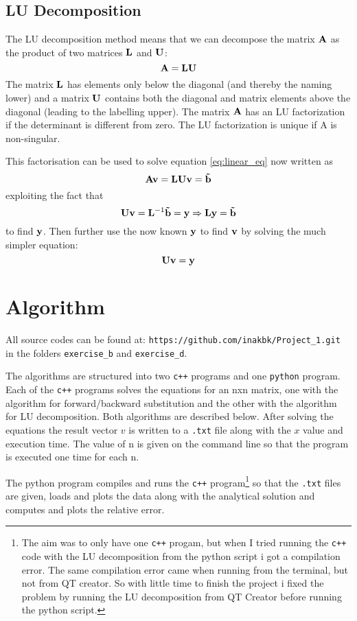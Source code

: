 \documentclass[11pt,a4wide]{article}
\begin{document}

\subsection{LU Decomposition}
The LU decomposition method means that we can decompose the matrix ${\bf A}$ as the product of two matrices ${\bf L}$ and ${\bf U}$:
\[
{\bf A} = {\bf L}{\bf U}
\]
 The matrix ${\bf L}$ has elements only below the diagonal (and thereby the naming lower) and a matrix ${\bf U}$ contains both the diagonal and matrix elements above the diagonal (leading to the labelling upper). The matrix ${\bf A}$ has an LU factorization if the determinant is different from zero. The LU factorization is unique if A is non-singular.
 
 This factorisation can be used to solve equation \ref{eq:linear_eq} now written as
\[
 {\bf A}{\bf v} = {\bf L}{\bf U}{\bf v} = {\bf \tilde{b}}
\]
exploiting the fact that
\[ 
{\bf U}{\bf v} = {\bf L}^{-1}{\bf \tilde{b}} = {\bf y} \Rightarrow {\bf L}{\bf y} = {\bf \tilde{b}}
\]
to find ${\bf y}$. Then further use the now known ${\bf y}$ to find ${\bf v}$ by solving the much simpler equation:
\[
{\bf U}{\bf v} = {\bf y}
\]


\section{Algorithm}
All source codes can be found at: \texttt{https://github.com/inakbk/Project\_1.git} in the folders \texttt{exercise\_b} and \texttt{exercise\_d}. 

The algorithms are structured into two \texttt{c++} programs and one \texttt{python} program. Each of the \texttt{c++} programs solves the equations for an nxn matrix, one with the algorithm for forward/backward substitution and the other with the algorithm for LU decomposition. Both algorithms are described below. After solving the equations the result vector $v$ is written to a \texttt{.txt} file along with the $x$ value and execution time. The value of n is given on the command line so that the program is executed one time for each n. 

The python program compiles and runs the \texttt{c++} program\footnote{The aim was to only have one \texttt{c++} progam, but when I tried running the \texttt{c++} code with the LU decomposition from the python script i got a compilation error. The same compilation error came when running from the terminal, but not from QT creator. So with little time to finish the project i fixed the problem by running the LU decomposition from QT Creator before running the python script. } so that the \texttt{.txt} files are given, loads and plots the data along with the analytical solution and computes and plots the relative error. 
\end{document}
